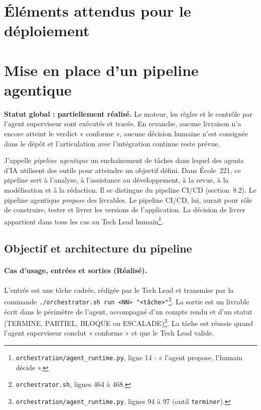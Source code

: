 \section{Éléments attendus pour le déploiement}

\section{Mise en place d'un pipeline agentique}

\textbf{Statut global : partiellement réalisé.} Le moteur, les règles et le contrôle par l'agent superviseur sont exécutés et tracés. En revanche, aucune livraison n'a encore atteint le verdict « conforme », aucune décision humaine n'est consignée dans le dépôt et l'articulation avec l'intégration continue reste prévue.

J'appelle \emph{pipeline agentique} un enchaînement de tâches dans lequel des agents d'IA utilisent des outils pour atteindre un objectif défini. Dans École~221, ce pipeline sert à l'analyse, à l'assistance au développement, à la revue, à la modélisation et à la rédaction. Il se distingue du pipeline CI/CD (section~8.2). Le pipeline agentique \emph{propose} des livrables. Le pipeline CI/CD, lui, aurait pour rôle de construire, tester et livrer les versions de l'application. La décision de livrer appartient dans tous les cas au Tech Lead humain\footnote{\nolinkurl{orchestration/agent_runtime.py}, ligne 14 : « l'agent propose, l'humain décide ».}.

\subsection{Objectif et architecture du pipeline}

\paragraph{Cas d'usage, entrées et sorties (Réalisé).} L'entrée est une tâche cadrée, rédigée par le Tech Lead et transmise par la commande \texttt{./orchestrator.sh run <NN> "<tâche>"}\footnote{\nolinkurl{orchestrator.sh}, lignes 464 à 468.}. La sortie est un livrable écrit dans le périmètre de l'agent, accompagné d'un compte rendu et d'un statut (TERMINE, PARTIEL, BLOQUE ou ESCALADE)\footnote{\nolinkurl{orchestration/agent_runtime.py}, lignes 94 à 97 (outil \texttt{terminer}).}. La tâche est réussie quand l'agent superviseur conclut « conforme » et que le Tech Lead valide.

